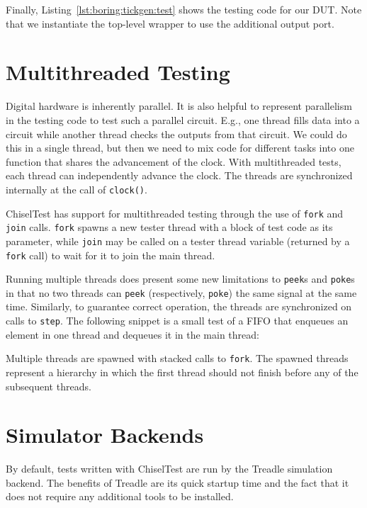 \documentclass[%
    10pt,
    headinclude, footexclude,
    openright, %
    notitlepage,
    cleardoubleempty,
    headsepline,
    pointlessnumbers,
    bibtotoc, idxtotoc,
    ]{scrbook}
\newcommand{\code}[1]{{\lstinline[basicstyle=\small\ttfamily]{#1}}}
\begin{document}

Finally, Listing~\ref{lst:boring:tickgen:test} shows the testing code for our DUT.
Note that we instantiate the top-level wrapper to use the additional output port.
\section{Multithreaded Testing}

Digital hardware is inherently parallel.
It is also helpful to represent parallelism in the testing code to test such a parallel circuit.
E.g., one thread fills data into a circuit while another thread checks the outputs from that circuit.
We could do this in a single thread, but then we need to mix code for different tasks
into one function that shares the advancement of the clock.
With multithreaded tests, each thread can independently advance the clock.
The threads are synchronized internally at the call of \code{clock()}.

ChiselTest has support for multithreaded testing through the use of \code{fork} and
\code{join} calls. \code{fork} spawns a new tester thread with a block of test code
as its parameter, while \code{join} may be called on a tester thread variable
(returned by a \code{fork} call) to wait for it to join the main thread.

Running multiple threads does present some new limitations to \code{peek}s and
\code{poke}s in that no two threads can \code{peek} (respectively, \code{poke}) the
same signal at the same time. Similarly, to guarantee correct operation, the threads
are synchronized on calls to \code{step}.
The following snippet is a small test of a FIFO that enqueues an element in one thread
and dequeues it in the main thread:


Multiple threads are spawned with stacked calls to \code{fork}. The spawned threads
represent a hierarchy in which the first thread should not finish before any of the
subsequent threads.

\section{Simulator Backends}

By default, tests written with ChiselTest are run by the Treadle simulation backend.
The benefits of Treadle are its quick startup time and the fact that it does not require any additional tools to be installed.
\end{document}
